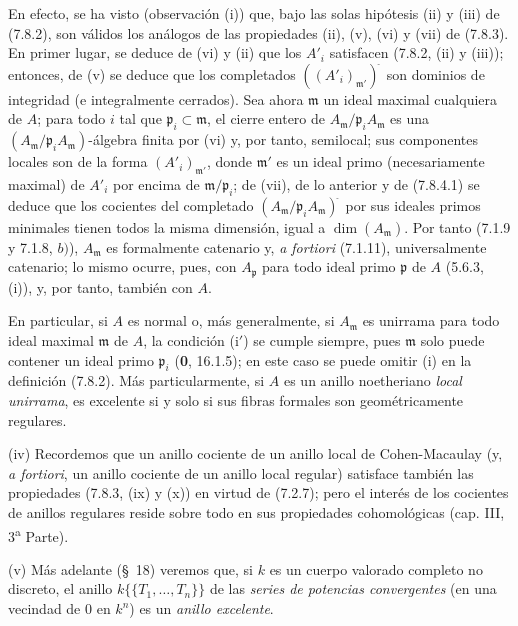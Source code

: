 \begin{remarks}[7.8.4]
En efecto, se ha visto (observación (i)) que, bajo las solas hipótesis
(ii) y (iii) de (7.8.2), son válidos los análogos de las propiedades
(ii), (v), (vi) y (vii) de (7.8.3). En primer lugar, se deduce de (vi) y
(ii) que los $A'_i$ satisfacen (7.8.2, (ii) y (iii)); entonces, de (v) se
deduce que los completados $((A'_i)_{\mathfrak m'})^{\widehat{\,}}$ son dominios de
integridad (e integralmente cerrados). Sea ahora $\mathfrak m$ un ideal
maximal cualquiera de $A$; para todo $i$ tal que
$\mathfrak p_i\subset\mathfrak m$, el cierre entero de
$A_{\mathfrak m}/\mathfrak p_iA_{\mathfrak m}$ es una
$(A_{\mathfrak m}/\mathfrak p_iA_{\mathfrak m})$-álgebra finita por (vi)
y, por tanto, semilocal; sus componentes locales son de la forma
$(A'_i)_{\mathfrak m'}$, donde $\mathfrak m'$ es un ideal primo
(necesariamente maximal) de $A'_i$ por encima de
$\mathfrak m/\mathfrak p_i$; de (vii), de lo anterior y de (7.8.4.1) se
deduce que los cocientes del completado
$(A_{\mathfrak m}/\mathfrak p_iA_{\mathfrak m})^{\widehat{\,}}$ por sus ideales
primos minimales tienen todos la misma dimensión, igual a
$\dim(A_{\mathfrak m})$. Por tanto (7.1.9 y 7.1.8, $b)$),
$A_{\mathfrak m}$ es formalmente catenario y, \emph{a fortiori} (7.1.11),
universalmente catenario; lo mismo ocurre, pues, con $A_{\mathfrak p}$
para todo ideal primo $\mathfrak p$ de $A$ (5.6.3, (i)), y, por tanto,
también con $A$.

En particular, si $A$ es normal o, más generalmente, si $A_{\mathfrak m}$
es unirrama para todo ideal maximal $\mathfrak m$ de $A$, la condición
(i$'$) se cumple siempre, pues $\mathfrak m$ solo puede contener un ideal
primo $\mathfrak p_i$ (\textbf 0, 16.1.5); en este caso se puede omitir (i) en la
definición (7.8.2). Más particularmente, si $A$ es un anillo noetheriano
\emph{local unirrama}, es excelente si y solo si sus fibras formales son
geométricamente regulares.

(iv) Recordemos que un anillo cociente de un anillo local de Cohen-Macaulay
(y, \emph{a fortiori}, un anillo cociente de un anillo local regular)
satisface también las propiedades (7.8.3, (ix) y (x)) en virtud de (7.2.7);
pero el interés de los cocientes de anillos regulares reside sobre todo
en sus propiedades cohomológicas (cap. III, 3\textsuperscript{a} Parte).

(v) Más adelante (\S~18) veremos que, si $k$ es un cuerpo valorado completo
no discreto, el anillo $k\{\!\{T_1,\ldots,T_n\}\!\}$ de las
\emph{series de potencias convergentes} (en una vecindad de $0$ en $k^n$)
es un \emph{anillo excelente}.
\end{remarks}

